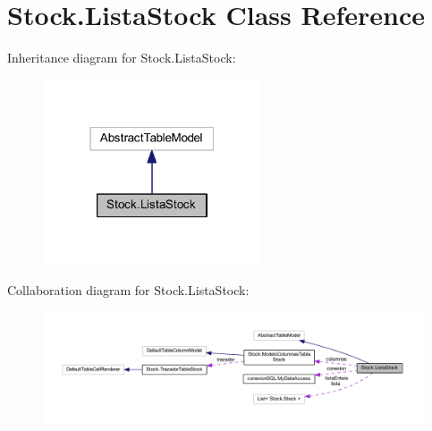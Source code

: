 \hypertarget{class_stock_1_1_lista_stock}{}\section{Stock.\+Lista\+Stock Class Reference}
\label{class_stock_1_1_lista_stock}


Inheritance diagram for Stock.\+Lista\+Stock\+:
\nopagebreak
\begin{figure}[H]
\begin{center}
\leavevmode
\includegraphics[width=183pt]{class_stock_1_1_lista_stock__inherit__graph}
\end{center}
\end{figure}


Collaboration diagram for Stock.\+Lista\+Stock\+:
\nopagebreak
\begin{figure}[H]
\begin{center}
\leavevmode
\includegraphics[width=350pt]{class_stock_1_1_lista_stock__coll__graph}
\end{center}
\end{figure}
